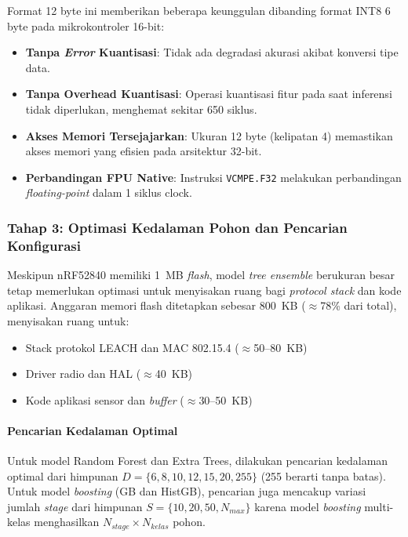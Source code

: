 Format 12 byte ini memberikan beberapa keunggulan dibanding format INT8 6 byte pada mikrokontroler 16-bit:
\begin{itemize}
    \item \textbf{Tanpa \textit{Error} Kuantisasi}: Tidak ada degradasi akurasi akibat konversi tipe data.
    \item \textbf{Tanpa Overhead Kuantisasi}: Operasi kuantisasi fitur pada saat inferensi tidak diperlukan, menghemat sekitar 650 siklus.
    \item \textbf{Akses Memori Tersejajarkan}: Ukuran 12 byte (kelipatan 4) memastikan akses memori yang efisien pada arsitektur 32-bit.
    \item \textbf{Perbandingan FPU Native}: Instruksi \texttt{VCMPE.F32} melakukan perbandingan \textit{floating-point} dalam 1 siklus clock.
\end{itemize}

\subsubsection{Tahap 3: Optimasi Kedalaman Pohon dan Pencarian Konfigurasi}

Meskipun nRF52840 memiliki 1~MB \textit{flash}, model \textit{tree ensemble} berukuran besar tetap memerlukan optimasi untuk menyisakan ruang bagi \textit{protocol stack} dan kode aplikasi. Anggaran memori flash ditetapkan sebesar 800~KB ($\approx$78\% dari total), menyisakan ruang untuk:

\begin{itemize}
    \item Stack protokol LEACH dan MAC 802.15.4 ($\approx$50--80~KB)
    \item Driver radio dan HAL ($\approx$40~KB)
    \item Kode aplikasi sensor dan \textit{buffer} ($\approx$30--50~KB)
\end{itemize}

\paragraph{Pencarian Kedalaman Optimal}
Untuk model Random Forest dan Extra Trees, dilakukan pencarian kedalaman optimal dari himpunan $D = \{6, 8, 10, 12, 15, 20, 255\}$ (255 berarti tanpa batas). Untuk model \textit{boosting} (GB dan HistGB), pencarian juga mencakup variasi jumlah \textit{stage} dari himpunan $S = \{10, 20, 50, N_{max}\}$ karena model \textit{boosting} multi-kelas menghasilkan $N_{stage} \times N_{kelas}$ pohon.

